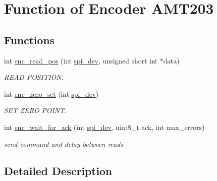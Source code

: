 \hypertarget{group__enc}{\section{Function of Encoder A\-M\-T203}
\label{group__enc}
}
\subsection*{Functions}
\begin{DoxyCompactItemize}
\item 
int \hyperlink{group__enc_ga813c09cc4d9af8b357fe440a9438e685}{enc\-\_\-read\-\_\-pos} (int \hyperlink{CommunicationV0_2communication_8c_a4788f0a5355494bc6c13690e28f43783}{spi\-\_\-dev}, unsigned short int $\ast$data)
\begin{DoxyCompactList}\small\item\em R\-E\-A\-D P\-O\-S\-I\-T\-I\-O\-N. \end{DoxyCompactList}\item 
int \hyperlink{group__enc_gaebbe7b9d3c2571f7481cefacbe36c498}{enc\-\_\-zero\-\_\-set} (int \hyperlink{CommunicationV0_2communication_8c_a4788f0a5355494bc6c13690e28f43783}{spi\-\_\-dev})
\begin{DoxyCompactList}\small\item\em S\-E\-T Z\-E\-R\-O P\-O\-I\-N\-T. \end{DoxyCompactList}\item 
int \hyperlink{group__enc_gad82fb44f2e735628ec95e003e4a1f93c}{enc\-\_\-wait\-\_\-for\-\_\-ack} (int \hyperlink{CommunicationV0_2communication_8c_a4788f0a5355494bc6c13690e28f43783}{spi\-\_\-dev}, uint8\-\_\-t ack, int max\-\_\-errors)
\begin{DoxyCompactList}\small\item\em send command and delay between reads \end{DoxyCompactList}\end{DoxyCompactItemize}


\subsection{Detailed Description}


